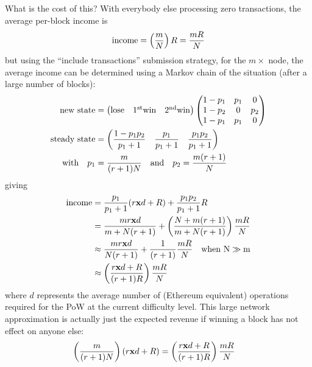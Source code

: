 \documentclass[10pt,a4paper]{article}
\begin{document}
What is the cost of this? With everybody else processing zero transactions, the average per-block income is
\begin{align}
\mathrm{income} = \left( \frac{m}{{N}} \right) {R} =  \frac{m{R}}{N} 
\end{align}
but using the ``include transactions'' submission strategy, for the $m\times$ node, the average income can be determined using a Markov chain of the situation (after a large number of blocks):
\begin{align}
\mathrm{new\ state} &= 
\left(
\begin{matrix}
\mathrm{lose} & \mathrm{1^{st}win} & \mathrm{2^{nd}win}
\end{matrix}
\right)
\left(
\begin{matrix}
1 - p_1 & p_1 & 0 \\
1 - p_2 & 0 & p_2 \\
1 - p_1 & p_1 & 0 \\ 
\end{matrix}
\right) \\
\mathrm{steady\ state} &= 
\left(
\frac{1 - p_1 p_2}{p_1 + 1} \quad \frac{p_1}{p_1+1} \quad \frac{p_1 p_2}{p_1 + 1}
\right) \\
\mathrm{with}\quad p_1 &= \frac{m}{(r+1){N}} \quad\mathrm{and}\quad p_2 = \frac{m(r+1)}{{N}}\\
\end{align}
giving
\begin{align}
\mathrm{income} &= \frac{p_1}{p_1+1} ( r{\mathbf x} d + {R} ) + \frac{p_1 p_2}{p_1 + 1} {R} \\
 &= \frac{mr{\mathbf x} d}{m + {N}(r + 1)} + \left(\frac{{N} + m(r+1)}{m + N(r+1)}\right) \frac{m{R}}{N}\\
 &\approx \frac{mr{\mathbf x} d}{{N}(r + 1)} + \frac{1}{(r+1)} \frac{m{R}}{N} \quad \mathrm{when\ {N}\gg m} \\
 &\approx \left(\frac{r{\mathbf x} d + {R}}{(r+1){R}}\right) \frac{m{R}}{N}
\end{align}
where $d$ represents the average number of (Ethereum equivalent) operations required for the PoW at the current difficulty level. This large network approximation is actually just the expected revenue if winning a block has not effect on anyone else:
\begin{align}
\left( \frac{m}{(r+1){N}} \right) \left( r{\mathbf x} d + {R} \right) &= \left(\frac{r{\mathbf x} d + {R}}{(r+1){R}}\right) \frac{m{R}}{N}
\end{align}
\end{document}
